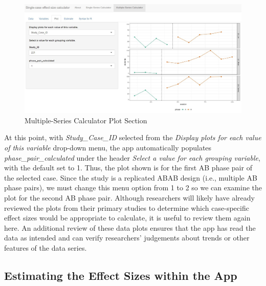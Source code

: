 \documentclass[
]{book}
\begin{document}
\begin{figure}
\includegraphics[width=0.75\linewidth]{images/multiseries_plot} \caption{Multiple-Series Calculator Plot Section}\label{fig:multipleseries-graph}
\end{figure}

At this point, with \emph{Study\_Case\_ID} selected from the \emph{Display plots for each value of this variable} drop-down menu, the app automatically populates \emph{phase\_pair\_calculated} under the header \emph{Select a value for each grouping variable}, with the default set to 1. Thus, the plot shown is for the first AB phase pair of the selected case. Since the \citet{Byiers2014} study is a replicated ABAB design (i.e., multiple AB phase pairs), we must change this menu option from 1 to 2 so we can examine the plot for the second AB phase pair. Although researchers will likely have already reviewed the plots from their primary studies to determine which case-specific effect sizes would be appropriate to calculate, it is useful to review them again here. An additional review of these data plots ensures that the app has read the data as intended and can verify researchers' judgements about trends or other features of the data series.

\hypertarget{estimating-the-effect-sizes-within-the-app}{%
\subsection{Estimating the Effect Sizes within the App}\label{estimating-the-effect-sizes-within-the-app}}
\end{document}

